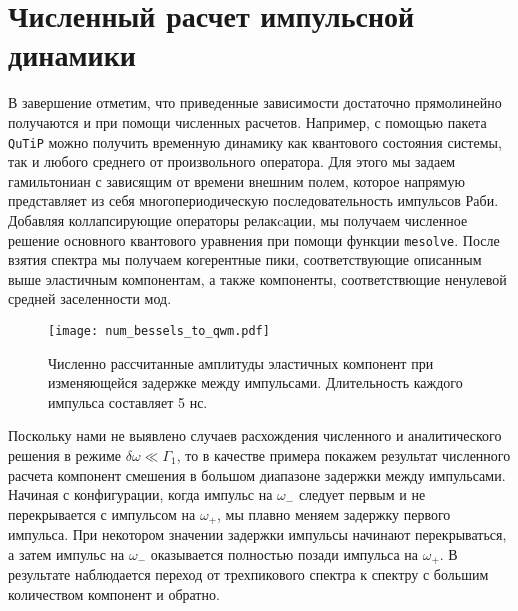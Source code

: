 \section{Численный расчет импульсной динамики}
В завершение отметим, что приведенные зависимости достаточно прямолинейно получаются и при помощи численных расчетов. Например, с помощью пакета \verb|QuTiP| \cite{qutip1,qutip2} можно получить временную динамику как квантового состояния системы, так и любого среднего от произвольного оператора. Для этого мы задаем гамильтониан с зависящим от времени внешним полем, которое напрямую представляет из себя многопериодическую последовательность импульсов Раби. Добавляя коллапсирующие операторы релакcации, мы получаем численное решение основного квантового уравнения при помощи функции \verb|mesolve|. После взятия спектра мы получаем когерентные пики, соответствующие описанным выше эластичным компонентам, а также компоненты, соответствющие ненулевой средней заселенности мод.
\begin{figure}
	\centering
	\texttt{[image: num\_bessels\_to\_qwm.pdf]}
	\caption[Численно рассчитанные амплитуды эластичных компонент при изменяющейся задержке между импульсами]{Численно рассчитанные амплитуды эластичных компонент при изменяющейся задержке между импульсами.  Длительность каждого импульса составляет 5 нс.}
	\label{fig: num_bess}
\end{figure} 

Поскольку нами не выявлено случаев расхождения численного и аналитического решения в режиме $\delta\omega \ll \Gamma_1$, то в качестве примера покажем результат численного расчета компонент смешения в большом диапазоне задержки между импульсами. Начиная с конфигурации, когда импульс на $\omega_-$ следует первым и не перекрывается с импульсом на $\omega_+$, мы плавно меняем задержку первого импульса. При некотором значении задержки импульсы начинают перекрываться, а затем импульс на $\omega_-$ оказывается полностью позади импульса на $\omega_+$. В результате наблюдается переход от трехпикового спектра к спектру с большим количеством компонент и обратно. 

